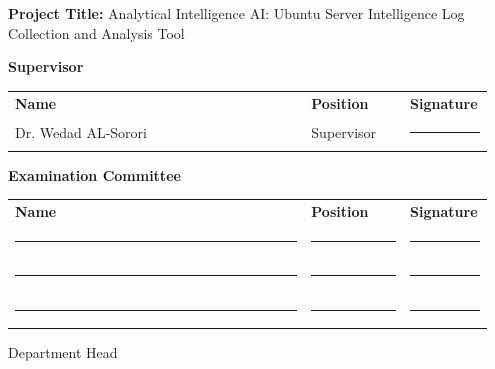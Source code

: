 \documentclass[12pt,a4paper]{report} %
\newenvironment{boxedlist}[1]{%
  \begin{mdframed}[
    linewidth=0.8pt,
    roundcorner=2pt,
    skipabove=10pt,
    skipbelow=14pt,
    innerleftmargin=14pt, innerrightmargin=14pt,
    innertopmargin=8pt, innerbottommargin=12pt,
    frametitle={\Large\bfseries #1},
    frametitlealignment=\center,
    frametitleaboveskip=2pt,
    frametitlebelowskip=8pt
  ]%
}{%
  \end{mdframed}%
}
\begin{document}
\clearpage
{}
\begin{boxedlist}{Examination Committee}
  \noindent\textbf{Project Title:} Analytical Intelligence AI: Ubuntu Server Intelligence Log Collection and Analysis Tool

  \vspace{0.8cm}
  \noindent\textbf{Supervisor}\\[0.3cm]
  \begin{tabular}{@{}p{0.6\linewidth}p{0.2\linewidth}p{0.15\linewidth}@{}}
    \textbf{Name} & \textbf{Position} & \textbf{Signature}\\
    Dr. Wedad AL-Sorori & Supervisor & \rule{0.9\linewidth}{0.4pt}\\
  \end{tabular}

  \vspace{0.8cm}
  \noindent\textbf{Examination Committee}\\[0.3cm]
  \begin{tabular}{@{}p{0.6\linewidth}p{0.2\linewidth}p{0.15\linewidth}@{}}
    \textbf{Name} & \textbf{Position} & \textbf{Signature}\\
    \rule{0.9\linewidth}{0.4pt} & \rule{0.9\linewidth}{0.4pt} & \rule{0.9\linewidth}{0.4pt}\\
    \rule{0.9\linewidth}{0.4pt} & \rule{0.9\linewidth}{0.4pt} & \rule{0.9\linewidth}{0.4pt}\\
    \rule{0.9\linewidth}{0.4pt} & \rule{0.9\linewidth}{0.4pt} & \rule{0.9\linewidth}{0.4pt}\\
  \end{tabular}

  \vspace{0.6cm}
  Department Head \dotfill
\end{boxedlist}


\newcommand{\boxedtitle}[1]{%
  \begin{center}
    \begin{mdframed}[linewidth=0.8pt, innertop=8pt, innerbottom=8pt, innerleft=14pt, innerright=14pt]
      \centering \Large\bfseries #1
    \end{mdframed}
  \end{center}
}
\end{document}
